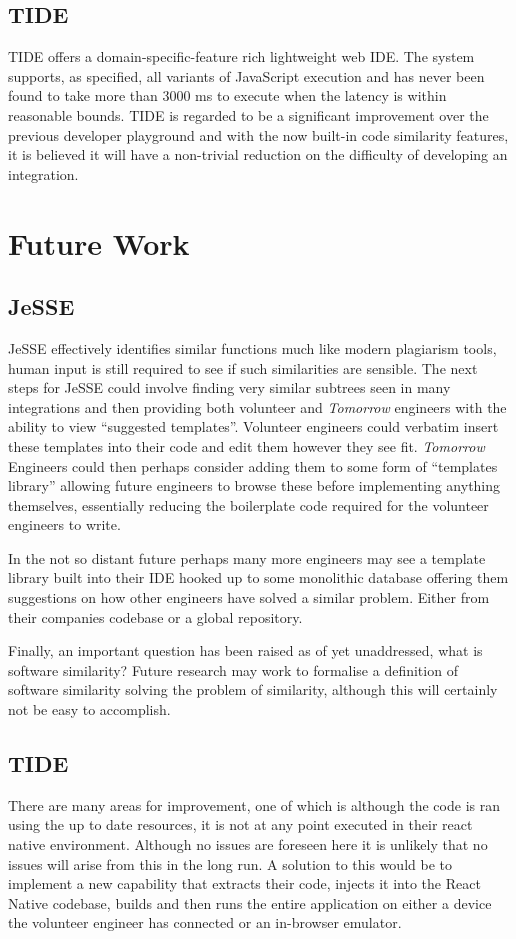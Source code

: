 \documentclass[jou,apacite]{apa6}
\begin{document}
\subsection{TIDE}
TIDE offers a domain-specific-feature rich lightweight web IDE. The system supports, as specified, all variants of JavaScript execution and has never been found to take more than 3000 ms to execute when the latency is within reasonable bounds. TIDE is regarded to be a significant improvement over the previous developer playground and with the now built-in code similarity features, it is believed it will have a non-trivial reduction on the difficulty of developing an integration.
 
 \clearpage
\section{Future Work}

\subsection{JeSSE}
 JeSSE effectively identifies similar functions much like modern plagiarism tools, human input is still required to see if such similarities are sensible. The next steps for JeSSE could involve finding very similar subtrees seen in many integrations and then providing both volunteer and \textit{Tomorrow} engineers with the ability to view “suggested templates”. Volunteer engineers could verbatim insert these templates into their code and edit them however they see fit.  \textit{Tomorrow} Engineers could then perhaps consider adding them to some form of “templates library” allowing future engineers to browse these before implementing anything themselves, essentially reducing the boilerplate code required for the volunteer engineers to write. 

In the not so distant future perhaps many more engineers may see a template library built into their IDE hooked up to some monolithic database offering them suggestions on how other engineers have solved a similar problem. Either from their companies codebase or a global repository.

Finally, an important question has been raised as of yet unaddressed, what is software similarity? Future research may work to formalise a definition of software similarity solving the problem of similarity, although this will certainly not be easy to accomplish. 

\subsection{TIDE}
There are many areas for improvement, one of which is although the code is ran using the up to date resources, it is not at any point executed in their react native environment. Although no issues are foreseen here it is unlikely that no issues will arise from this in the long run. A solution to this would be to implement a new capability that extracts their code, injects it into the React Native codebase, builds and then runs the entire application on either a device the volunteer engineer has connected or an in-browser emulator. 
\end{document}
